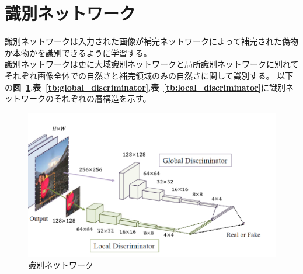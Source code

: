 \documentclass[a4j, 11pt]{jreport}
\newcommand{\figref}[1]{\textbf{図~\ref{#1}}}
\newcommand{\tabref}[1]{\textbf{表~\ref{#1}}}
\begin{document}
\section{識別ネットワーク}
識別ネットワークは入力された画像が補完ネットワークによって補完された偽物か本物かを識別できるように学習する。\\
識別ネットワークは更に大域識別ネットワークと局所識別ネットワークに別れてそれぞれ画像全体での自然さと補完領域のみの自然さに関して識別する。
以下の\figref{fig:discrimination},\tabref{tb:global_discriminator},\tabref{tb:local_discriminator}に識別ネットワークのそれぞれの層構造を示す。
\begin{figure}[H]
	\centering
	\includegraphics[width=\linewidth]{images/old-study/discriminator.png}
	\caption{識別ネットワーク}
	\label{fig:discrimination}
\end{figure}
\end{document}
